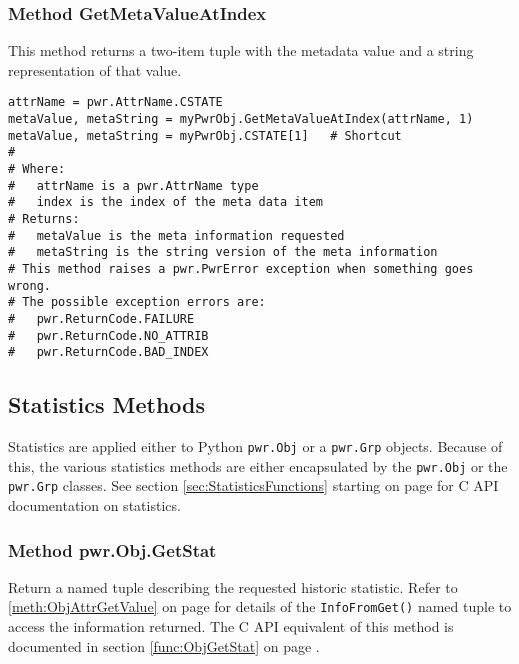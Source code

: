\documentclass[12pt]{report} %
\begin{document}
\begin{appendices}
\subsubsection{Method GetMetaValueAtIndex} \label{meth:GetMetaValueAtIndex}

This method returns a two-item tuple with the metadata value and a string representation of that value.
\begin{center}\begin{minipage}{.95\linewidth}\begin{lstlisting}
attrName = pwr.AttrName.CSTATE
metaValue, metaString = myPwrObj.GetMetaValueAtIndex(attrName, 1)
metaValue, metaString = myPwrObj.CSTATE[1]   # Shortcut
#
# Where:
#   attrName is a pwr.AttrName type
#   index is the index of the meta data item
# Returns:
#   metaValue is the meta information requested
#   metaString is the string version of the meta information
# This method raises a pwr.PwrError exception when something goes wrong.
# The possible exception errors are:
#   pwr.ReturnCode.FAILURE
#   pwr.ReturnCode.NO_ATTRIB
#   pwr.ReturnCode.BAD_INDEX
\end{lstlisting}\end{minipage}\end{center}

\subsection{Statistics Methods} \label{sec:PythonStatisticsMethods}

Statistics are applied either to Python \texttt{pwr.Obj} or a \texttt{pwr.Grp}
objects. Because of this, the various statistics methods are either
encapsulated by the \texttt{pwr.Obj} or the \texttt{pwr.Grp} classes. See
section \ref{sec:StatisticsFunctions} starting on page
\pageref{sec:StatisticsFunctions} for C API documentation on statistics.

\subsubsection{Method pwr.Obj.GetStat} \label{meth:ObjGetStat}

Return a named tuple describing the requested historic statistic. Refer to
\ref{meth:ObjAttrGetValue} on page \pageref{meth:ObjAttrGetValue} for details
of the \texttt{InfoFromGet()} named tuple to access the information returned. The
C API equivalent of this method is documented in section
\ref{func:ObjGetStat} on page \pageref{func:ObjGetStat}.


\end{appendices}
\end{document}
